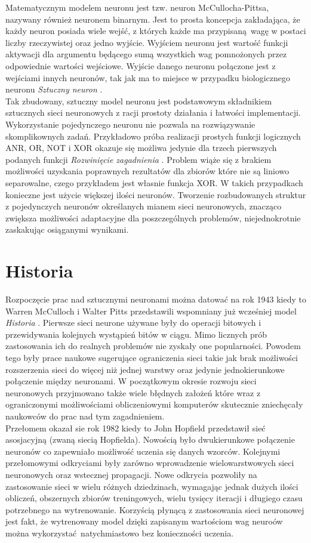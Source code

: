 Matematycznym modelem neuronu jest tzw. neuron McCullocha-Pittsa, nazywany
również neuronem binarnym. Jest to prosta koncepcja zakładająca, że każdy neuron
posiada wiele wejść, z których każde ma przypisaną wagę w postaci liczby
rzeczywistej oraz jedno wyjście. Wyjściem neuronu jest wartość funkcji aktywacji
dla argumentu będącego sumą wszystkich wag pomnożonych przez odpowiednie
wartości wejściowe. Wyjście danego neuronu połączone jest z wejściami innych
neuronów, tak jak ma to miejsce w przypadku biologicznego neuronu \textit{Sztuczny neuron} \cite{CS231n}.\\
Tak zbudowany, sztuczny model neuronu jest podstawowym składnikiem sztucznych sieci
neuronowych z racji prostoty działania i łatwości implementacji.\\
Wykorzystanie pojedynczego neuronu nie pozwala na rozwiązywanie skomplikownych zadań.
Przykładowo próba realizacji prostych funkcji logicznych ANR, OR, NOT i XOR okazuje
się możliwa jedynie dla trzech pierwszych podanych funkcji \textit{Rozwinięcie zagadnienia} \cite{XORproblem}.
Problem wiąże się z brakiem możliwości uzyskania poprawnych rezultatów dla zbiorów które
nie są liniowo separowalne, czego przykładem jest własnie funkcja XOR. W takich przypadkach
konieczne jest użycie większej ilości neuronów. Tworzenie rozbudowanych struktur z pojedynczych
neuronów określanych mianem sieci neuronowych, znacząco zwiększa możliwości adaptacyjne
dla poszczególnych problemów, niejednokrotnie zaskakując osiąganymi wynikami.


\section{Historia}

Rozpoczęcie prac nad sztucznymi neuronami można datować na rok 1943 kiedy to
Warren McCulloch i Walter Pitts przedstawili wspomniany już wcześniej model \textit{Historia} \cite{NNbiology}.
Pierwsze sieci neurone używane były do operacji bitowych i przewidywania kolejnych
wystąpień bitów w ciągu. Mimo licznych prób zastosowania ich do realnych problemów
nie zyskały one popularności. Powodem tego były prace naukowe sugerujące ograniczenia
sieci takie jak brak możliwości rozszerzenia sieci do więcej niż jednej warstwy oraz
jedynie jednokierunkowe połączenie między neuronami. W początkowym okresie rozwoju
sieci neuronowych przyjmowano także wiele błędnych założeń które wraz z ograniczonymi
możliwościami obliczeniowymi komputerów skutecznie zniechęcały naukowców do prac
nad tym zagadnieniem.\\
Przełomem okazał sie rok 1982 kiedy to John Hopfield przedstawił sieć asosjacyjną
(zwaną siecią Hopfielda). Nowością było dwukierunkowe połączenie neuronów co
zapewniało możliwość uczenia się danych wzorców. Kolejnymi przełomowymi odkryciami
były zarówno wprowadzenie wielowarstwowych sieci neuronowych oraz wstecznej
propagacji. Nowe odkrycia pozwoliły na zastosowanie sieci w wielu różnych
dziedzinach, wymagając jednak dużych ilości obliczeń, obszernych zbiorów
treningowych, wielu tysięcy iteracji i długiego czasu potrzebnego na wytrenowanie.
Korzyścią płynącą z zastosowania sieci neuronowej jest fakt, że wytrenowany model
dzięki zapisanym wartościom wag neuroów można wykorzystać natychmiastowo bez konieczności
uczenia.
